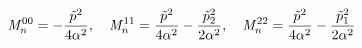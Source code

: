\begin{equation}
{\mathit {M} }^{00}_{n} = - \frac {\tilde p^2}{4\alpha^2}
,~~~{\mathit {M} }^{11}_{n} =  \frac {\tilde p^2}{4\alpha^2} - 
\frac {\tilde p_2^2}{2\alpha^2},~~~ 
{\mathit {M} }^{22}_{n} =   \frac {\tilde p^2}{4\alpha^2} - 
\frac {\tilde p_1^2}{2\alpha^2} \\
\end{equation}


